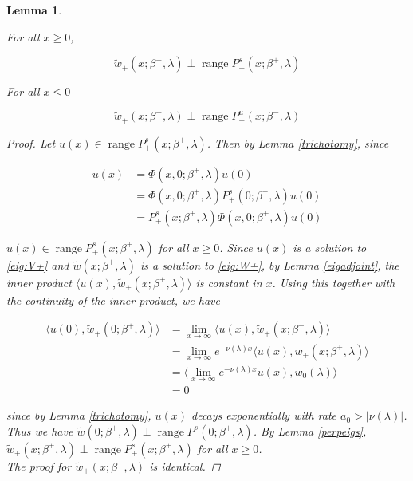 \documentclass[12pt]{article}
\DeclareMathOperator{\ran}{range}
\newtheorem{lemma}{Lemma}
\begin{document}
\begin{lemma}\label{perpouter}

For all $x \geq 0$,

\begin{equation}
\tilde{w}_+(x; \beta^+, \lambda) \perp \ran P^s_+(x; \beta^+, \lambda)
\end{equation}

For all $x \leq 0$

\begin{equation}
\tilde{w}_+(x; \beta^-, \lambda) \perp \ran P^u_+(x; \beta^-, \lambda)
\end{equation}

\begin{proof}

Let $u(x) \in \ran P^s_+(x; \beta^+, \lambda)$. Then by Lemma \ref{trichotomy}, since

\begin{align*}
u(x) &= \Phi(x, 0; \beta^+, \lambda)u(0) \\
&= \Phi(x, 0; \beta^+, \lambda) P^s_+(0; \beta^+, \lambda)u(0)\\
&= P^s_+(x; \beta^+, \lambda) \Phi(x, 0; \beta^+, \lambda) u(0)
\end{align*}

$u(x) \in \ran P^s_+(x; \beta^+, \lambda)$ for all $x \geq 0$. Since $u(x)$ is a solution to \eqref{eig:V+} and $\tilde{w}(x; \beta^+, \lambda)$ is a solution to \eqref{eig:W+}, by Lemma \ref{eigadjoint}, the inner product $\langle u(x), \tilde{w}_+(x; \beta^+, \lambda) \rangle$ is constant in $x$. Using this together with the continuity of the inner product, we have

\begin{align*}
\langle u(0), \tilde{w}_+(0; \beta^+, \lambda) \rangle &=
\lim_{x \rightarrow \infty} \langle u(x), \tilde{w}_+(x; \beta^+, \lambda) \rangle\\
 &= \lim_{x \rightarrow \infty} e^{-\nu(\lambda) x} \langle u(x), w_+(x; \beta^+, \lambda) \rangle \\
&= \langle \lim_{x \rightarrow \infty} e^{-\nu(\lambda) x} u(x), w_0(\lambda) \rangle \\
&= 0
\end{align*}

since by Lemma \ref{trichotomy}, $u(x)$ decays exponentially with rate $a_0 > |\nu(\lambda)|$. Thus we have $\tilde{w}(0; \beta^+, \lambda) \perp \ran P^s(0; \beta^+, \lambda)$. By Lemma \ref{perpeigs}, $\tilde{w}_+(x; \beta^+, \lambda) \perp \ran P^s_+(x; \beta^+, \lambda)$ for all $x \geq 0$.\\

The proof for $\tilde{w}_+(x; \beta^-, \lambda)$ is identical.

\end{proof}
\end{lemma} 
\end{document}

